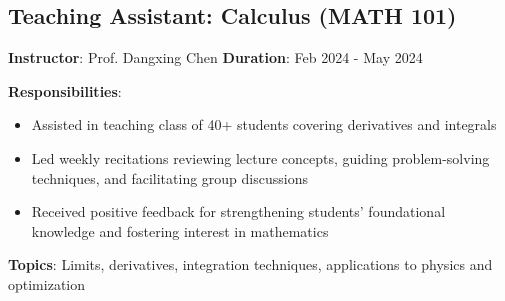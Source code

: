 
\subsection*{Teaching Assistant: Calculus (MATH 101)}

\textbf{Instructor}: Prof. Dangxing Chen \quad \textbf{Duration}: Feb 2024 - May 2024

\textbf{Responsibilities}:
\begin{itemize}[leftmargin=1.2em, itemsep=0.1em]
  \item Assisted in teaching class of 40+ students covering derivatives and integrals
  \item Led weekly recitations reviewing lecture concepts, guiding problem-solving techniques, and facilitating group discussions
  \item Received positive feedback for strengthening students' foundational knowledge and fostering interest in mathematics
\end{itemize}

\vspace{0.5em}

\textbf{Topics}: Limits, derivatives, integration techniques, applications to physics and optimization


